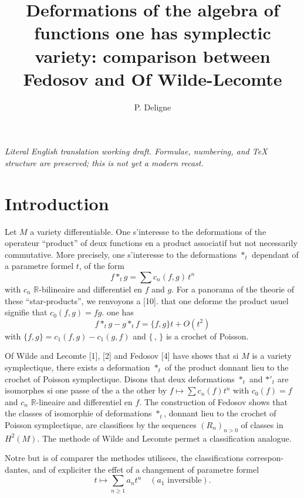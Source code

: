 \documentclass[11pt,a4paper]{article}
\theoremstyle{plain}
\theoremstyle{definition}
\newcommand{\R}{\mathbb{R}}
\begin{document}
\begin{center}\small\emph{Literal English translation working draft. Formulae, numbering, and TeX structure are preserved; this is not yet a modern recast.}\end{center}
\vspace{0.5em}


\title{Deformations of the algebra of functions one has symplectic variety: comparison between Fedosov and Of Wilde-Lecomte}
\author{P. Deligne}
\date{}
\maketitle

\section*{Introduction}

Let $M$ a variety differentiable. One s'interesse to the deformations of the operateur
``product'' of deux functions en a product associatif but not necessarily
commutative. More precisely, one s'interesse to the deformations $*_{t}$ dependant of a
parametre formel $t$, of the form
\[
f *_{t} g = \sum c_{n}(f,g)\, t^{n}
\]
with $c_{n}$ $\R$-bilineaire and differentiel en $f$ and $g$. For a panorama of the theorie of these
``star-products'', we renvoyons a [10]. that one deforme the product usuel signifie that
$c_{0}(f, g) = fg$. one has
\[
f *_{t} g - g *_{t} f = \{f,g\}t + O(t^{2})
\]
with $\{f, g\} = c_{1}(f, g) - c_{1}(g, f)$ and $\{\, , \,\}$ is a crochet of Poisson.

Of Wilde and Lecomte [1], [2] and Fedosov [4] have shows that si $M$ is a variety
symplectique, there exists a deformation $*_{t}$ of the product donnant lieu to the crochet of
Poisson symplectique. Disons that deux deformations $*_{t}$ and $*'_{t}$ are isomorphes si
one passe of the a the other by $f \mapsto \sum c_{n}(f)t^{n}$ with $c_{0}(f) = f$ and $c_{n}$ $\R$-lineaire and
differentiel en $f$. The construction of Fedosov shows that the classes of isomorphie of
deformations $*_{t}$, donnant lieu to the crochet of Poisson symplectique, are classifiees
by the sequences $(R_{n})_{n > 0}$ of classes in $H^{2}(M)$. The methode of Wilde and Lecomte
permet a classification analogue.

Notre but is of comparer the methodes utilisees, the classifications correspon-
dantes, and of expliciter the effet of a changement of parametre formel
\[
t \mapsto \sum_{n \geq 1} a_{n} t^{n} \quad (a_{1} \text{ inversible}).
\]
\end{document}
